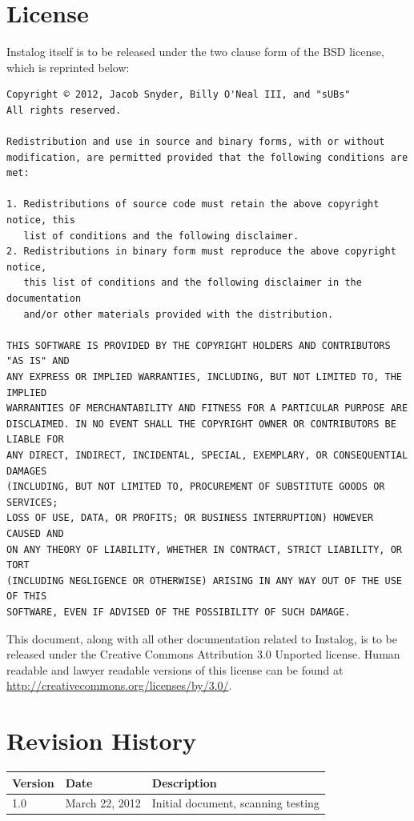 \documentclass[letterpaper,12pt]{article}
\begin{document}
\newpage


\appendix
\section{License} \label{license}
Instalog itself is to be released under the two clause form of the BSD license,
which is reprinted below:

\begin{verbatim}
Copyright © 2012, Jacob Snyder, Billy O'Neal III, and "sUBs"
All rights reserved.

Redistribution and use in source and binary forms, with or without
modification, are permitted provided that the following conditions are met: 

1. Redistributions of source code must retain the above copyright notice, this
   list of conditions and the following disclaimer. 
2. Redistributions in binary form must reproduce the above copyright notice,
   this list of conditions and the following disclaimer in the documentation
   and/or other materials provided with the distribution. 

THIS SOFTWARE IS PROVIDED BY THE COPYRIGHT HOLDERS AND CONTRIBUTORS "AS IS" AND
ANY EXPRESS OR IMPLIED WARRANTIES, INCLUDING, BUT NOT LIMITED TO, THE IMPLIED
WARRANTIES OF MERCHANTABILITY AND FITNESS FOR A PARTICULAR PURPOSE ARE
DISCLAIMED. IN NO EVENT SHALL THE COPYRIGHT OWNER OR CONTRIBUTORS BE LIABLE FOR
ANY DIRECT, INDIRECT, INCIDENTAL, SPECIAL, EXEMPLARY, OR CONSEQUENTIAL DAMAGES
(INCLUDING, BUT NOT LIMITED TO, PROCUREMENT OF SUBSTITUTE GOODS OR SERVICES;
LOSS OF USE, DATA, OR PROFITS; OR BUSINESS INTERRUPTION) HOWEVER CAUSED AND
ON ANY THEORY OF LIABILITY, WHETHER IN CONTRACT, STRICT LIABILITY, OR TORT
(INCLUDING NEGLIGENCE OR OTHERWISE) ARISING IN ANY WAY OUT OF THE USE OF THIS
SOFTWARE, EVEN IF ADVISED OF THE POSSIBILITY OF SUCH DAMAGE.
\end{verbatim}

This document, along with all other documentation related to Instalog,  is to be
released under the Creative Commons Attribution 3.0 Unported license. Human
readable and lawyer readable versions of this license can be found at
\url{http://creativecommons.org/licenses/by/3.0/}.

\newpage

\section{Revision History} \label{revision_history}
\begin{tabular}{| l | l | l |}
\hline
\textbf{Version} & \textbf{Date} & \textbf{Description} \\
\hline
1.0 & March 22, 2012 & Initial document, scanning testing \\
\hline
\end{tabular}
\end{document}
